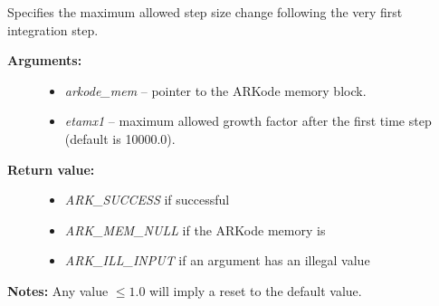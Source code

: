 \documentclass[letterpaper,10pt,english]{sphinxmanual}
\begin{document}
\begin{fulllineitems}
\label{c_interface/User_callable:c.ARKodeSetMaxFirstGrowth}
Specifies the maximum allowed step size change following the very
first integration step.
\begin{description}
\item[{\textbf{Arguments:}}] \leavevmode\begin{itemize}
\item {} 
\emph{arkode\_mem} -- pointer to the ARKode memory block.

\item {} 
\emph{etamx1} -- maximum allowed growth factor after the first time
step (default is 10000.0).

\end{itemize}

\item[{\textbf{Return value:}}] \leavevmode\begin{itemize}
\item {} 
\emph{ARK\_SUCCESS} if successful

\item {} 
\emph{ARK\_MEM\_NULL} if the ARKode memory is 

\item {} 
\emph{ARK\_ILL\_INPUT} if an argument has an illegal value

\end{itemize}

\end{description}

\textbf{Notes:} Any value \(\le 1.0\) will imply a reset to the default value.

\end{fulllineitems}

\end{document}
